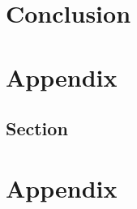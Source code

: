 \documentclass[
		11pt,
		a4paper,
		titlepage=firstiscover,
	]{scrreprt}
\renewcommand{\headrulewidth}{0.4pt}
\renewcommand{\chaptermark}[1]{\markboth{\thechapter\ #1}{}}
\renewcommand{\sectionmark}[1]{\markright{\thesection\ #1}}
\renewcommand{\headrulewidth}{0pt}
\begin{document}
    
    \chapter{Conclusion}
	

	
	
	
	\clearpage
	\newpage
	 \nocite{*} %
	
	\pagestyle{fancy}
	\fancyhead{}
	\fancyfoot{}
	\fancyhead[R]{\rightmark}
	\renewcommand{\headrulewidth}{0.4pt}
	\fancyfoot[R]{\thepage}
	\renewcommand{\chaptermark}[1]{\markboth{\thechapter\ #1}{}}
	\renewcommand{\sectionmark}[1]{\markright{\thesection\ #1}}
	
	
	\newpage
	
	 \begin{appendices}
	 	\chapter{Appendix}
	 	\section{Section}
	 	\chapter{Appendix}
	\end{appendices}
	
	
\end{document}
